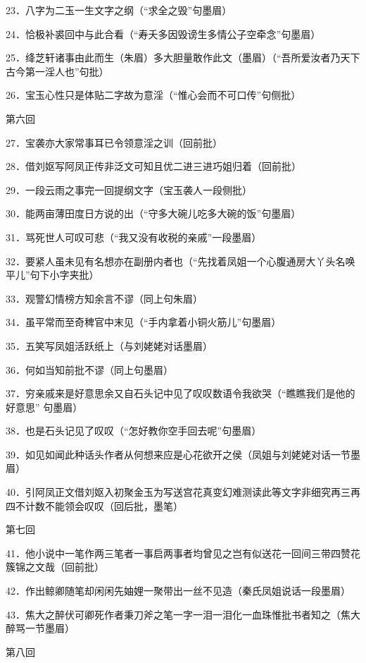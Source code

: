23．八字为二玉一生文字之纲{（\kaishu ``求全之毁''句墨眉）}

24．恰极补裘回中与此合看{（\kaishu ``寿夭多因毁谤生多情公子空牵念''句墨眉）}

25．绛芝轩诸事由此而生{（\kaishu 朱眉）}多大胆量敢作此文{（\kaishu 墨眉）（``吾所爱汝者乃天下古今第一淫人也''句批）}

26．宝玉心性只是体贴二字故为意淫{（\kaishu ``惟心会而不可口传''句侧批）}

第六回

27．宝袭亦大家常事耳已令领意淫之训{（\kaishu 回前批）}

28．借刘妪写阿凤正传非泛文可知且优二进三进巧姐归着{（\kaishu 回前批）}

29．一段云雨之事完一回提纲文字{（\kaishu 宝玉袭人一段侧批）}

30．能两亩薄田度日方说的出{（\kaishu ``守多大碗儿吃多大碗的饭''句墨眉）}

31．骂死世人可叹可悲{（\kaishu ``我又没有收税的亲戚''一段墨眉）}

32．要紧人虽未见有名想亦在副册内者也{（\kaishu ``先找着凤姐一个心腹通房大丫头名唤平儿''句下小字夹批）}

33．观警幻情榜方知余言不谬{（\kaishu 同上句朱眉）}

34．虽平常而至奇稗官中末见{（\kaishu ``手内拿着小铜火筋儿''句墨眉）}

35．五笑写凤姐活跃纸上{（\kaishu 与刘姥姥对话墨眉）}

36．何如当知前批不谬{（\kaishu 同上句墨眉）}

37．穷亲戚来是好意思余又自石头记中见了叹叹数语令我欲哭{（\kaishu ``瞧瞧我们是他的好意思''
句墨眉）}

38．也是石头记见了叹叹{（\kaishu ``怎好教你空手回去呢''句墨眉）}

39．如见如闻此种话头作者从何想来应是心花欲开之侯{（\kaishu 凤姐与刘姥姥对话一节墨眉）}

40．引阿凤正文借刘妪入初聚金玉为写送宫花真变幻难测读此等文字非细究再三再四不计数不能领会叹叹{（\kaishu 回后批，墨笔）}

第七回

41．他小说中一笔作两三笔者一事启两事者均曾见之岂有似送花一回间三带四赞花簇锦之文哉{（\kaishu 回前批）}

42．作出鲸卿随笔却闲闲先妯娌一聚带出一丝不见造{（\kaishu 秦氏凤姐说话一段墨眉）}

43．焦大之醉伏可卿死作者秉刀斧之笔一字一泪一泪化一血珠惟批书者知之{（\kaishu 焦大醉骂一节墨眉）}

第八回

